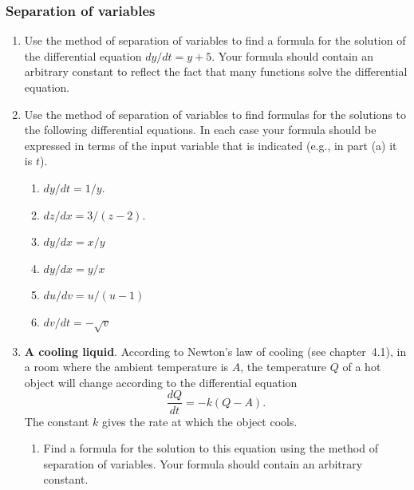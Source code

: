 \subsubsection{Separation of variables}
\label{subsubsec:separation-of-variables}




\begin{enumerate}
\item Use the method of separation of variables to find a formula for
the solution of the differential equation $dy/dt = y + 5$.  Your
formula should contain an arbitrary constant to reflect the fact that
many functions solve the differential equation.




\item Use the method of separation of variables to find formulas for
the solutions to the following differential equations.  In each case
your formula should be expressed in terms of the input variable that
is indicated (e.g., in part (a) it is $t$).



  \begin{enumerate}
  \item $dy/dt = 1/y$.

  \item $dz/dx = 3/(z - 2)$.

  \item $dy/dx = x/y$

  \item $dy/dx = y/x$


  \item $du/dv = u/(u - 1)$


  \item $dv/dt = -\sqrt{v}$
\mbox{}


\end{enumerate}
\item {\bf A cooling liquid}.  According to Newton's law of
cooling (see chapter~4.1), in a room
where the ambient temperature is $A$, the temperature $Q$ of a hot
object will change according to the differential equation
	\[
\dfrac{dQ}{dt} = -k(Q - A).
\]
The constant $k$ gives the rate at which the object cools.

  \begin{enumerate}
  \item Find a formula for the solution to this equation using the method
of separation of variables.  Your formula should contain an arbitrary
constant.


\end{enumerate}
\end{enumerate}
